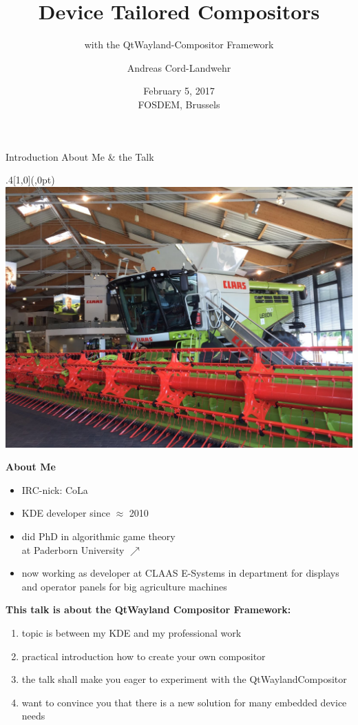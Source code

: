 \documentclass[ucs,9pt]{beamer}
\title[Device Tailored Wayland Compositors]{Device Tailored Compositors}
\subtitle{with the QtWayland-Compositor Framework}
\author{Andreas Cord-Landwehr}
\date{\textnormal{February 5, 2017\\[\medskipamount] FOSDEM, Brussels}}
\begin{document}
\maketitle

\begin{frame}
    {Introduction}
    {About Me \& the Talk}

    \begin{textblock*}{.4\paperwidth}[1,0](\paperwidth,0pt)%
        \includegraphics[width=\linewidth]{lexion.jpg}
    \end{textblock*}%

    \textbf{About Me}
    \begin{itemize}
        \item IRC-nick: CoLa
        \item KDE developer since $\approx$ 2010
        \item did PhD in algorithmic game theory\\ at Paderborn University \hspace{2.5cm}$\nearrow$
        \item now working as developer at CLAAS E-Systems in department for displays and operator panels for big agriculture machines
    \end{itemize}
    \bigskip

    \textbf{This talk is about the QtWayland Compositor Framework:}
    \begin{enumerate}
        \item topic is between my KDE and my professional work
        \item practical introduction how to create your own compositor
        \item the talk shall make you eager to experiment with the QtWaylandCompositor
        \item want to convince you that there is a new solution for many embedded device needs
    \end{enumerate}
\end{frame}
\end{document}
